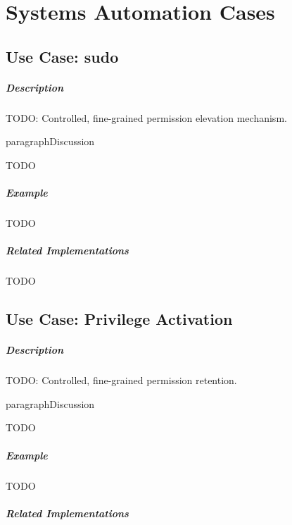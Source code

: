 \chapter{Systems Automation Cases}

\section{Use Case: \textsf{sudo}}

\paragraph{Description}

{\Large TODO:} Controlled, fine-grained permission elevation mechanism.

paragraph{Discussion}

{\Large TODO}

\paragraph{Example}

{\Large TODO}

\paragraph{Related Implementations}

{\Large TODO}

\section{Use Case: Privilege Activation}

\paragraph{Description}

{\Large TODO:} Controlled, fine-grained permission retention.

paragraph{Discussion}

{\Large TODO}

\paragraph{Example}

{\Large TODO}

\paragraph{Related Implementations}

